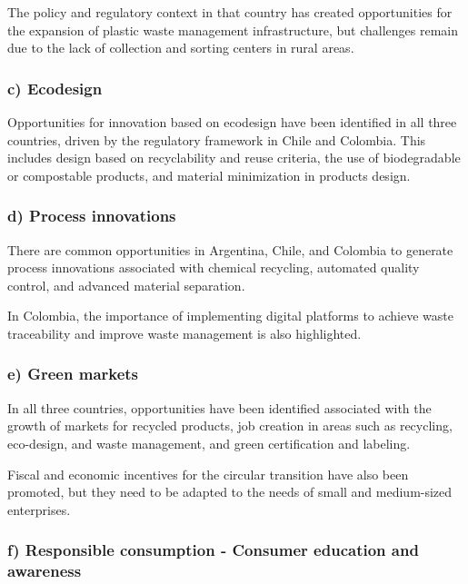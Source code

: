 \documentclass[
  12pt,
  oneside]{book}
\begin{document}
The policy and regulatory context in that country has created
opportunities for the expansion of plastic waste management
infrastructure, but challenges remain due to the lack of collection and
sorting centers in rural areas.

\subsubsection{c) Ecodesign}\label{c-ecodesign}

Opportunities for innovation based on ecodesign have been identified in
all three countries, driven by the regulatory framework in Chile and
Colombia. This includes design based on recyclability and reuse
criteria, the use of biodegradable or compostable products, and material
minimization in products design.

\subsubsection{d) Process innovations}\label{d-process-innovations}

There are common opportunities in Argentina, Chile, and Colombia to
generate process innovations associated with chemical recycling,
automated quality control, and advanced material separation.

In Colombia, the importance of implementing digital platforms to achieve
waste traceability and improve waste management is also highlighted.

\subsubsection{e) Green markets}\label{e-green-markets}

In all three countries, opportunities have been identified associated
with the growth of markets for recycled products, job creation in areas
such as recycling, eco-design, and waste management, and green
certification and labeling.

Fiscal and economic incentives for the circular transition have also
been promoted, but they need to be adapted to the needs of small and
medium-sized enterprises.

\subsubsection{f) Responsible consumption - Consumer education and
awareness}\label{f-responsible-consumption---consumer-education-and-awareness}
\end{document}
